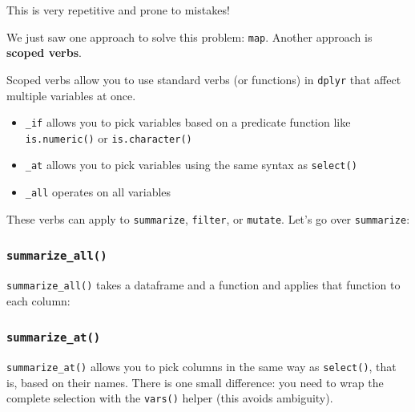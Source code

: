 \documentclass[]{book}
\newenvironment{Shaded}{\begin{snugshade}}{\end{snugshade}}
\newcommand{\CommentTok}[1]{\textcolor[rgb]{0.56,0.35,0.01}{\textit{#1}}}
\newcommand{\DataTypeTok}[1]{\textcolor[rgb]{0.13,0.29,0.53}{#1}}
\newcommand{\KeywordTok}[1]{\textcolor[rgb]{0.13,0.29,0.53}{\textbf{#1}}}
\newcommand{\NormalTok}[1]{#1}
\newcommand{\OperatorTok}[1]{\textcolor[rgb]{0.81,0.36,0.00}{\textbf{#1}}}
\newcommand{\StringTok}[1]{\textcolor[rgb]{0.31,0.60,0.02}{#1}}
\providecommand{\tightlist}{%
  \setlength{\itemsep}{0pt}\setlength{\parskip}{0pt}}
\begin{document}
This is very repetitive and prone to mistakes!

We just saw one approach to solve this problem: \texttt{map}. Another approach is \textbf{scoped verbs}.

Scoped verbs allow you to use standard verbs (or functions) in \texttt{dplyr} that affect multiple variables at once.

\begin{itemize}
\tightlist
\item
  \texttt{\_if} allows you to pick variables based on a predicate function like \texttt{is.numeric()} or \texttt{is.character()}
\item
  \texttt{\_at} allows you to pick variables using the same syntax as \texttt{select()}
\item
  \texttt{\_all} operates on all variables
\end{itemize}

These verbs can apply to \texttt{summarize}, \texttt{filter}, or \texttt{mutate}. Let's go over \texttt{summarize}:

\hypertarget{summarize_all}{%
\subsubsection*{\texorpdfstring{\texttt{summarize\_all()}}{summarize\_all()}}\label{summarize_all}}

\texttt{summarize\_all()} takes a dataframe and a function and applies that function to each column:

\begin{Shaded}
\end{Shaded}

\hypertarget{summarize_at}{%
\subsubsection*{\texorpdfstring{\texttt{summarize\_at()}}{summarize\_at()}}\label{summarize_at}}

\texttt{summarize\_at()} allows you to pick columns in the same way as \texttt{select()}, that is, based on their names. There is one small difference: you need to wrap the complete selection with the \texttt{vars()} helper (this avoids ambiguity).
\end{document}
